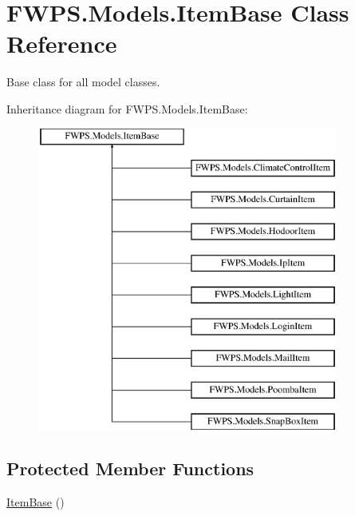\hypertarget{class_f_w_p_s_1_1_models_1_1_item_base}{}\section{F\+W\+P\+S.\+Models.\+Item\+Base Class Reference}
\label{class_f_w_p_s_1_1_models_1_1_item_base}


Base class for all model classes.  


Inheritance diagram for F\+W\+P\+S.\+Models.\+Item\+Base\+:\begin{figure}[H]
\begin{center}
\leavevmode
\includegraphics[height=10.000000cm]{class_f_w_p_s_1_1_models_1_1_item_base}
\end{center}
\end{figure}
\subsection*{Protected Member Functions}
\begin{DoxyCompactItemize}
\item 
\mbox{\hyperlink{class_f_w_p_s_1_1_models_1_1_item_base_a07172aa2fec852152ef0269966869756}{Item\+Base}} ()
\end{DoxyCompactItemize}

